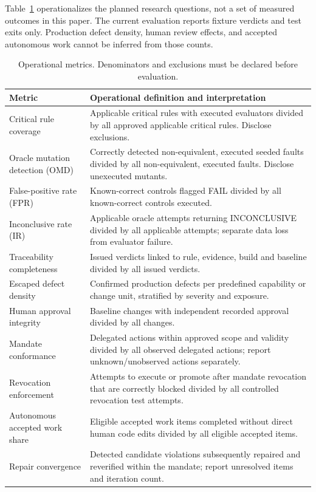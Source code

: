 \documentclass[11pt,a4paper]{article}
\newcommand{\FAIL}{\textsf{FAIL}}
\newcommand{\INC}{\textsf{INCONCLUSIVE}}
\begin{document}
Table~\ref{tab:metrics} operationalizes the planned research questions, not a set of measured outcomes in this paper. The current evaluation reports fixture verdicts and test exits only. Production defect density, human review effects, and accepted autonomous work cannot be inferred from those counts.

\begin{table}[htbp]
\centering\footnotesize
\caption{Operational metrics. Denominators and exclusions must be declared before evaluation.}
\begin{tabularx}{\linewidth}{@{}p{39mm}X@{}}
\toprule
Metric & Operational definition and interpretation \\
\midrule
Critical rule coverage & Applicable critical rules with executed evaluators divided by all approved applicable critical rules. Disclose exclusions. \\
Oracle mutation detection (OMD) & Correctly detected non-equivalent, executed seeded faults divided by all non-equivalent, executed faults. Disclose unexecuted mutants. \\
False-positive rate (FPR) & Known-correct controls flagged \FAIL{} divided by all known-correct controls executed. \\
Inconclusive rate (IR) & Applicable oracle attempts returning \INC{} divided by all applicable attempts; separate data loss from evaluator failure. \\
Traceability completeness & Issued verdicts linked to rule, evidence, build and baseline divided by all issued verdicts. \\
Escaped defect density & Confirmed production defects per predefined capability or change unit, stratified by severity and exposure. \\
Human approval integrity & Baseline changes with independent recorded approval divided by all changes. \\
Mandate conformance & Delegated actions within approved scope and validity divided by all observed delegated actions; report unknown/unobserved actions separately. \\
Revocation enforcement & Attempts to execute or promote after mandate revocation that are correctly blocked divided by all controlled revocation test attempts. \\
Autonomous accepted work share & Eligible accepted work items completed without direct human code edits divided by all eligible accepted items. \\
Repair convergence & Detected candidate violations subsequently repaired and reverified within the mandate; report unresolved items and iteration count. \\
\bottomrule
\end{tabularx}
\label{tab:metrics}
\end{table}
\end{document}
